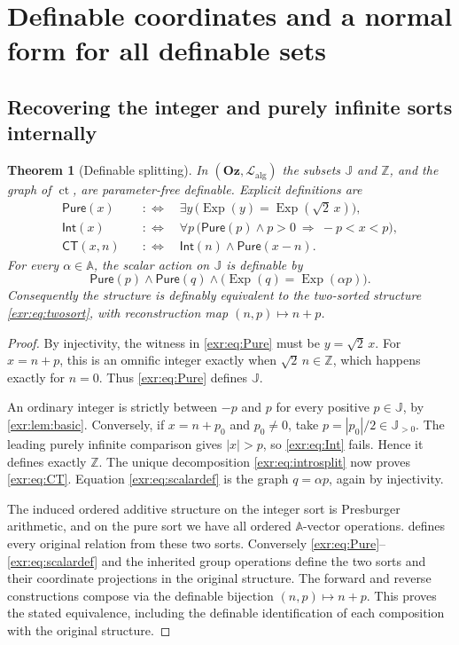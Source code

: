 \documentclass[11pt,letterpaper]{article}
\numberwithin{equation}{section}
\newtheorem{theorem}{Theorem}[section]
\theoremstyle{definition}
\theoremstyle{remark}
\newcommand{\Oz}{\mathbf{Oz}}
\newcommand{\Z}{\mathbb Z}
\newcommand{\A}{\mathbb A}
\newcommand{\J}{\mathbb J}
\newcommand{\Lalg}{\mathcal L_{\mathrm{alg}}}
\newcommand{\ct}{\operatorname{ct}}
\newcommand{\Exp}{\operatorname{Exp}}
\newcommand{\Pure}{\mathsf{Pure}}
\newcommand{\Int}{\mathsf{Int}}
\newcommand{\ctgraph}{\mathsf{CT}}
\begin{document}
\section{Definable coordinates and a normal form for all definable sets}\label{exr:sec:definable}
\subsection{Recovering the integer and purely infinite sorts internally}
\begin{theorem}[Definable splitting]\label{exr:thm:defsplit}
In $(\Oz,\Lalg)$ the subsets $\J$ and $\Z$, and the graph of $\ct$, are
parameter-free definable. Explicit definitions are
\begin{align}
 \Pure(x)&\quad:\Longleftrightarrow\quad
 \exists y\,\bigl(\Exp(y)=\Exp(\sqrt2\,x)\bigr),\label{exr:eq:Pure}\\
 \Int(x)&\quad:\Longleftrightarrow\quad
 \forall p\,\bigl(\Pure(p)\land p>0\ \Longrightarrow\ -p<x<p\bigr),\label{exr:eq:Int}\\
 \ctgraph(x,n)&\quad:\Longleftrightarrow\quad
 \Int(n)\land\Pure(x-n).\label{exr:eq:CT}
\end{align}
For every $\alpha\in\A$, the scalar action on $\J$ is definable by
\begin{equation}\label{exr:eq:scalardef}
 \Pure(p)\land\Pure(q)\land\bigl(\Exp(q)=\Exp(\alpha p)\bigr).
\end{equation}
Consequently the structure is definably equivalent to the two-sorted structure
\eqref{exr:eq:twosort}, with reconstruction map $(n,p)\mapsto n+p$.
\end{theorem}
\begin{proof}
By injectivity, the witness in \eqref{exr:eq:Pure} must be $y=\sqrt2\,x$. For
$x=n+p$, this is an omnific integer exactly when $\sqrt2\,n\in\Z$, which happens
exactly for $n=0$. Thus \eqref{exr:eq:Pure} defines $\J$.

An ordinary integer is strictly between $-p$ and $p$ for every positive
$p\in\J$, by \cref{exr:lem:basic}. Conversely, if $x=n+p_0$ and $p_0\ne0$, take
$p=|p_0|/2\in\J_{>0}$. The leading purely infinite comparison gives
$|x|>p$, so \eqref{exr:eq:Int} fails. Hence it defines exactly $\Z$.
The unique decomposition \eqref{exr:eq:introsplit} now proves \eqref{exr:eq:CT}.
Equation \eqref{exr:eq:scalardef} is the graph $q=\alpha p$, again by injectivity.

The induced ordered additive structure on the integer sort is Presburger
arithmetic, and on the pure sort we have all ordered $\A$-vector operations.
 defines every original relation from these two sorts.
Conversely \eqref{exr:eq:Pure}--\eqref{exr:eq:scalardef} and the inherited group operations
define the two sorts and their coordinate projections in the original structure.
The forward and reverse constructions compose via the definable bijection
$(n,p)\mapsto n+p$. This proves the stated equivalence, including the definable
identification of each composition with the original structure.
\end{proof}
\end{document}
